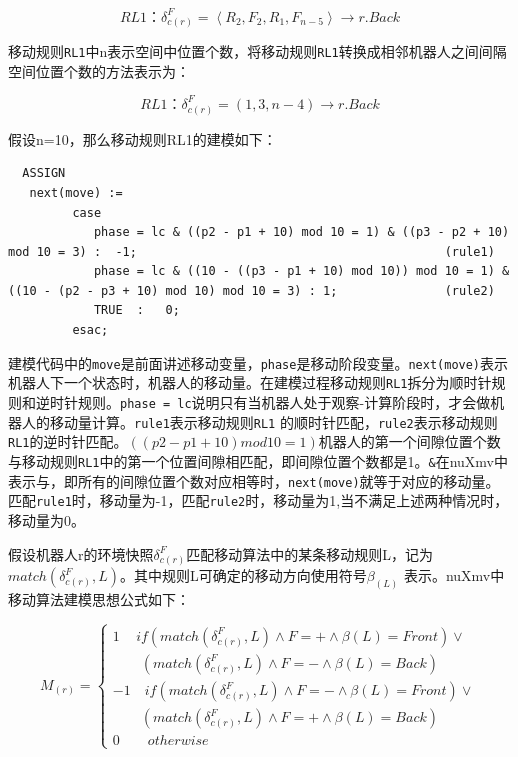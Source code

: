 $$RL1：\delta_{c\left(r\right)}^F = \left\langle R_2,F_2,R_1,F_{n-5} \right\rangle \rightarrow r.Back$$

移动规则\verb|RL1|中n表示空间中位置个数，将移动规则\verb|RL1|转换成相邻机器人之间间隔空间位置个数的方法表示为：

$$RL1：\delta_{c\left(r\right)}^F = \left(1,3,n-4\right) \rightarrow r.Back$$

假设n=10，那么移动规则RL1的建模如下：

\begin{lstlisting}
  ASSIGN
   next(move) :=
         case
            phase = lc & ((p2 - p1 + 10) mod 10 = 1) & ((p3 - p2 + 10) mod 10 = 3) :  -1;                                           (rule1)
            phase = lc & ((10 - ((p3 - p1 + 10) mod 10)) mod 10 = 1) & ((10 - (p2 - p3 + 10) mod 10) mod 10 = 3) : 1;               (rule2)
            TRUE  :   0;
         esac;
\end{lstlisting}

建模代码中的\verb|move|是前面讲述移动变量，\verb|phase|是移动阶段变量。\verb|next(move)|表示机器人下一个状态时，机器人的移动量。在建模过程移动规则\verb|RL1|拆分为顺时针规则和逆时针规则。\verb|phase = lc|说明只有当机器人处于观察-计算阶段时，才会做机器人的移动量计算。\verb|rule1|表示移动规则\verb|RL1| 的顺时针匹配，\verb|rule2|表示移动规则\verb|RL1|的逆时针匹配。$\left(\left(p2 - p1 + 10\right) mod 10 = 1\right)$机器人的第一个间隙位置个数与移动规则\verb|RL1|中的第一个位置间隙相匹配，即间隙位置个数都是1。\verb|&|在nuXmv中表示与，即所有的间隙位置个数对应相等时，\verb|next(move)|就等于对应的移动量。匹配\verb|rule1|时，移动量为-1，匹配\verb|rule2|时，移动量为1,当不满足上述两种情况时，移动量为0。

假设机器人r的环境快照$\delta_{c\left( r \right)}^F$匹配移动算法中的某条移动规则L，记为$match\left(\delta_{c\left( r \right)}^F,L\right)$。其中规则L可确定的移动方向使用符号$\beta_{\left(L\right)}$ 表示。nuXmv中移动算法建模思想公式如下：

$$ M_{\left(r\right)} = \left\{
\begin{array}{lcl}
1 \quad \, if \left( match \left( \delta_{c\left(r\right)}^F,L\right) \land F=+ \land \beta\left(L\right) = Front\right) \lor \\ \quad \quad  \left(match \left( \delta_{c\left(r\right)}^F,L\right) \land F=- \land \beta\left(L\right) = Back \right) \\
-1 \quad if \left( match \left( \delta_{c\left(r\right)}^F,L\right) \land F=- \land \beta\left(L\right) = Front\right) \lor \\ \quad \quad  \left(match \left( \delta_{c\left(r\right)}^F,L\right) \land F=+ \land \beta\left(L\right) = Back \right) \\
0 \quad \quad  otherwise
\end{array}
\right. $$

